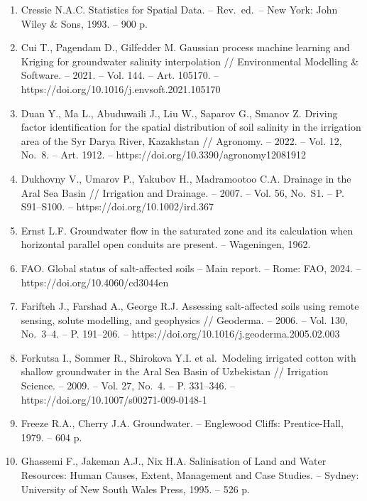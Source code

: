 \begin{enumerate}
  Corwin D.L., Scudiero E. Review of soil salinity assessment for
  agriculture across multiple scales using proximal and/or remote
  sensors // Advances in Agronomy. -- 2019. -- Vol. 158. -- P. 1--130.
  -- https://doi.org/10.1016/bs.agron.2019.07.001
\item
  Cressie N.A.C. Statistics for Spatial Data. -- Rev.~ed.~-- New York:
  John Wiley \& Sons, 1993. -- 900 p.
\item
  Cui T., Pagendam D., Gilfedder M. Gaussian process machine learning
  and Kriging for groundwater salinity interpolation // Environmental
  Modelling \& Software. -- 2021. -- Vol. 144. -- Art. 105170. --
  https://doi.org/10.1016/j.envsoft.2021.105170
\item
  Duan Y., Ma L., Abuduwaili J., Liu W., Saparov G., Smanov Z. Driving
  factor identification for the spatial distribution of soil salinity in
  the irrigation area of the Syr Darya River, Kazakhstan // Agronomy. --
  2022. -- Vol. 12, No.~8. -- Art. 1912. --
  https://doi.org/10.3390/agronomy12081912
\item
  Dukhovny V., Umarov P., Yakubov H., Madramootoo C.A. Drainage in the
  Aral Sea Basin // Irrigation and Drainage. -- 2007. -- Vol. 56,
  No.~S1. -- P. S91--S100. -- https://doi.org/10.1002/ird.367
\item
  Ernst L.F. Groundwater flow in the saturated zone and its calculation
  when horizontal parallel open conduits are present. -- Wageningen,
  1962.
\item
  FAO. Global status of salt-affected soils -- Main report. -- Rome:
  FAO, 2024. -- https://doi.org/10.4060/cd3044en
\item
  Farifteh J., Farshad A., George R.J. Assessing salt-affected soils
  using remote sensing, solute modelling, and geophysics // Geoderma. --
  2006. -- Vol. 130, No.~3--4. -- P. 191--206. --
  https://doi.org/10.1016/j.geoderma.2005.02.003
\item
  Forkutsa I., Sommer R., Shirokova Y.I. et al.~Modeling irrigated
  cotton with shallow groundwater in the Aral Sea Basin of Uzbekistan //
  Irrigation Science. -- 2009. -- Vol. 27, No.~4. -- P. 331--346. --
  https://doi.org/10.1007/s00271-009-0148-1
\item
  Freeze R.A., Cherry J.A. Groundwater. -- Englewood Cliffs:
  Prentice-Hall, 1979. -- 604 p.
\item
  Ghassemi F., Jakeman A.J., Nix H.A. Salinisation of Land and Water
  Resources: Human Causes, Extent, Management and Case Studies. --
  Sydney: University of New South Wales Press, 1995. -- 526 p.

\end{enumerate}
